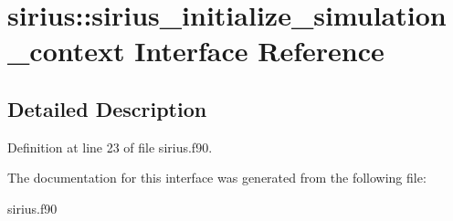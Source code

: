 \hypertarget{interfacesirius_1_1sirius__initialize__simulation__context}{}\section{sirius\+:\+:sirius\+\_\+initialize\+\_\+simulation\+\_\+context Interface Reference}
\label{interfacesirius_1_1sirius__initialize__simulation__context}


\subsection{Detailed Description}


Definition at line 23 of file sirius.\+f90.



The documentation for this interface was generated from the following file\+:\begin{DoxyCompactItemize}
\item 
sirius.\+f90\end{DoxyCompactItemize}
